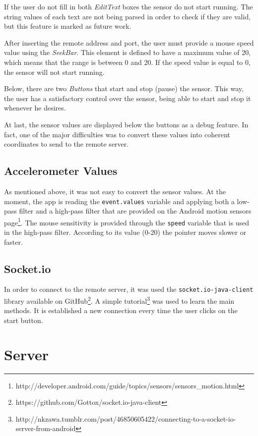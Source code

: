 \documentclass{llncs}
\begin{document}
If the user do not fill in both \textit{EditText} boxes the sensor do not start running. The string values of each text are not being parsed in order to check if they are valid, but this feature is marked as future work.

After inserting the remote address and port, the user must provide a mouse speed value using the \textit{SeekBar}. This element is defined to have a maximum value of 20, which means that the range is between 0 and 20. If the speed value is equal to 0, the sensor will not start running.

Below, there are two \textit{Buttons} that start and stop (pause) the sensor. This way, the user has a satisfactory control over the sensor, being able to start and stop it whenever he desires.

At last, the sensor values are displayed below the buttons as a debug feature. In fact, one of the major difficulties was to convert these values into coherent coordinates to send to the remote server.

\subsection{Accelerometer Values}

As mentioned above, it was not easy to convert the sensor values. At the moment, the app is reading the \texttt{event.values} variable and applying both a low-pass filter and a high-pass filter that are provided on the Android motion sensors page\footnote{http://developer.android.com/guide/topics/sensors/sensors\_motion.html}. The mouse sensitivity is provided through the \texttt{speed} variable that is used in the high-pass filter. According to its value (0-20) the pointer moves slower or faster.

\subsection{Socket.io}

In order to connect to the remote server, it was used the \texttt{socket.io-java-client} library available on GitHub\footnote{https://github.com/Gottox/socket.io-java-client}. A simple tutorial\footnote{http://nkzawa.tumblr.com/post/46850605422/connecting-to-a-socket-io-server-from-android} was used to learn the main methods. It is established a new connection every time the user clicks on the start button.

\section{Server}
\end{document}
